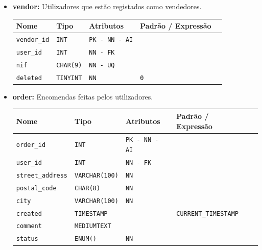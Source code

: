 \begin{itemize}
    \item \textbf{vendor:}
    Utilizadores que estão registados como vendedores.
    \begin{table}[H]
        \centering
        \begin{tabularx}{\linewidth}{XXXXX}
        \toprule
        \textbf{\color{color_scheme}Nome} & \textbf{\color{color_scheme}Tipo} & \textbf{\color{color_scheme}Atributos} & \textbf{\color{color_scheme}Padrão / Expressão}\\
        \midrule
        \texttt{vendor\_id} & \texttt{INT} & \texttt{PK - NN - AI} &\\
        \texttt{user\_id} & \texttt{INT} & \texttt{NN - FK} & \\
        \texttt{nif} & \texttt{CHAR(9)} & \texttt{NN - UQ} & \\
        \texttt{deleted} & \texttt{TINYINT}  & \texttt{NN}  & \texttt{0} \\
        \bottomrule
        \end{tabularx}
        \label{table: vendor}
    \end{table}

    \item \textbf{order:}
    Encomendas feitas pelos utilizadores. 
    \begin{table}[H]
        \centering
        \begin{tabularx}{\linewidth}{XXXXX}
        \toprule
        \textbf{\color{color_scheme}Nome} & \textbf{\color{color_scheme}Tipo} & \textbf{\color{color_scheme}Atributos} & \textbf{\color{color_scheme}Padrão / Expressão}\\
        \midrule
        \texttt{order\_id} & \texttt{INT} & \texttt{PK - NN - AI} &\\
        \texttt{user\_id} & \texttt{INT}  & \texttt{NN - FK}  &  \\
        \texttt{street\_address} & \texttt{VARCHAR(100)}  & \texttt{NN}  & \\
        \texttt{postal\_code} & \texttt{CHAR(8)}  & \texttt{NN}  & \\
        \texttt{city} & \texttt{VARCHAR(100)}  & \texttt{NN}  & \\
        \texttt{created} & \texttt{TIMESTAMP}  &  & \texttt{CURRENT\_TIMESTAMP}\\
        \texttt{comment} & \texttt{MEDIUMTEXT}  &  & \\
        \texttt{status} & \texttt{ENUM()}  & \texttt{NN}  &  \\
        \bottomrule
        \end{tabularx}
        \label{table: order}
    \end{table}


\end{itemize}
